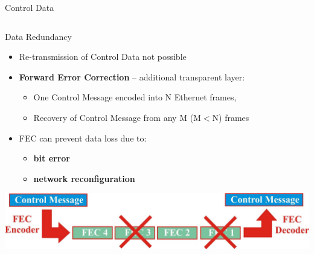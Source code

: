 \documentclass[compress,red]{beamer}
\begin{document}
\begin{frame}{Control Data}
\begin{columns}[c]
\begin{center}
    \end{center}

\end{columns}

\end{frame}
\begin{frame}{Data Redundancy}

  \begin{itemize}
    \item Re-transmission of Control Data not possible
	\item {\bf Forward Error Correction}  -- additional transparent layer:
	\begin{itemize}
		\item One Control Message encoded into N Ethernet frames,
		\item Recovery of Control Message from any M (M$<$N) frames
	\end{itemize}
	\item FEC can prevent data loss due to:
	\begin{itemize}	
		\item {\bf bit error} 
		\item {\bf network reconfiguration}
	\end{itemize}	
  \end{itemize}
  
  	\begin{center}
      \includegraphics[width=.7\textwidth]{../../figures/robustness/FEC.pdf}
    \end{center}
  
\end{frame}
\end{document}
